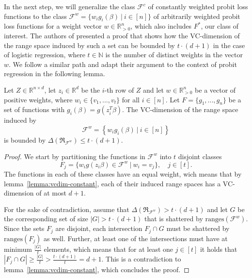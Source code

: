 In the next step, we will generalize the class $\mathcal{F}^c$
of constantly weighted probit loss functions to the class
$\mathcal{F}^w = \{w_ig_i(\beta)\ |\ i \in [n]\}$ of arbitrarily
weighted probit loss functions for a weight vector
$w \in \mathbb{R}^n_{>0}$, which also includes $F^\ast$,
our class of interest.
The authors of \cite{on-coresets} presented a proof that shows
how the VC-dimension of the range space induced by such a
set can be bounded by $t\cdot(d+1)$ in the case of logistic
regression, where $t \in \mathbb{N}$ is the number of distinct
weights in the vector $w$.
We follow a similar path and adapt their argument to the
context of probit regression in the following lemma.

\begin{lemma}
    \label{lemma:vcdim-arbitrary}
    Let $Z \in \mathbb{R}^{n \times d}$, let $z_i \in \mathbb{R}^d$ be the
    $i$-th row of $Z$ and let
    $w \in \mathbb{R}^n_{>0}$ be a vector of positive weights,
    where $w_i \in \{ v_1, ..., v_t \}$ for all $i \in [n]$.
    Let $F = \{g_1, ..., g_n\}$ be a set of functions with
    $g_i(\beta) = g(z_i^T \beta)$.
    The VC-dimension of the range space induced by
    \begin{equation*}
        \mathcal{F}^w = \left\{ w_ig_i(\beta) \ |\ i \in [n] \right\}
    \end{equation*}
    is bounded by
    $\Delta(\mathfrak{R}_{\mathcal{F}^w}) \leq t \cdot (d + 1)$.
\end{lemma}
\begin{proof}
    We start by partitioning the functions in
    $\mathcal{F}^w$ into $t$ disjoint classes
    \begin{equation*}
        F_j = \{ w_ig(z_i\beta) \in \mathcal{F}^w \
        |\ w_i = v_j \},\quad j \in [t].
    \end{equation*}
    The functions in each of these classes have an equal
    weight, wich means that by lemma~\ref{lemma:vcdim-constant}, each of
    their induced range spaces has a VC-dimension of at most $d+1$.

    For the sake of contradiction, assume that
    $\Delta(\mathfrak{R}_{\mathcal{F}^w}) > t \cdot (d + 1)$ and let
    $G$ be the corresponding set of size $|G| > t \cdot (d + 1)$ that
    is shattered by $\text{ranges}(\mathcal{F}^w)$.
    Since the sets $F_j$ are disjoint, each intersection
    $F_j \cap G$ must be shattered by $\text{ranges}(F_j)$ as well.
    Further, at least one of the intersections must have at minimum
    $\frac{|G|}{t}$ elements, which means that for at least one $j \in [t]$
    it holds that
    $|F_j \cap G| \geq \frac{|G|}{t} > \frac{t \cdot (d+1)}{t} = d + 1$.
    This is a contradiction to lemma~\ref{lemma:vcdim-constant}, which
    concludes the proof.
\end{proof}

